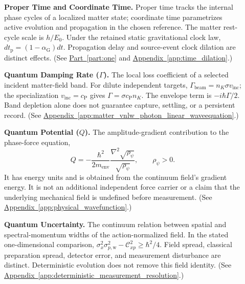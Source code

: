 \begin{description}
\item[] \begin{minipage}[t]{\linewidth}
\textbf{Proper Time and Coordinate Time.} Proper time tracks the internal phase cycles of a localized matter state; coordinate time parametrizes active evolution and propagation in the chosen reference. The matter rest-cycle scale is $h/E_0$. Under the retained static gravitational clock law, $dt_{\mathrm p}=(1-\alpha_{\mathrm G})dt$. Propagation delay and source-event clock dilation are distinct effects.
(See \hyperref[part:one]{Part~\ref*{part:one}} and \hyperref[app:time_dilation]{Appendix~\ref*{app:time_dilation}}.)
\end{minipage}

\item[] \begin{minipage}[t]{\linewidth}
\textbf{Quantum Damping Rate ($\Gamma$).} The local loss coefficient of a selected incident matter-field band. For dilute independent targets, $\Gamma_{\mathrm{beam}}=n_K\sigma v_{\mathrm{inc}}$; the specialization $v_{\mathrm{inc}}=c_{\mathrm P}$ gives $\Gamma=\sigma c_{\mathrm P}n_K$. The envelope term is $-i\hbar\Gamma/2$. Band depletion alone does not guarantee capture, settling, or a persistent record.
(See \hyperref[app:matter_vnlw_photon_linear_waveequation]{Appendix~\ref*{app:matter_vnlw_photon_linear_waveequation}}.)
\end{minipage}

\item[] \begin{minipage}[t]{\linewidth}
\textbf{Quantum Potential ($Q$).} The amplitude-gradient contribution to the phase-force equation,
\[
 Q=-\frac{\hbar^2}{2m_{\mathrm{env}}}
       \frac{\nabla^2\sqrt{\rho_\psi}}{\sqrt{\rho_\psi}},
 \qquad \rho_\psi>0.
\]
It has energy units and is obtained from the continuum field's gradient energy. It is not an additional independent force carrier or a claim that the underlying mechanical field is undefined before measurement.
(See \hyperref[app:physical_wavefunction]{Appendix~\ref*{app:physical_wavefunction}}.)
\end{minipage}

\item[] \begin{minipage}[t]{\linewidth}
\textbf{Quantum Uncertainty.} The continuum relation between spatial and spectral-momentum widths of the action-normalized field. In the stated one-dimensional comparison, $\sigma_x^2\sigma_{p,\mathrm w}^2-\mathcal C_{xp}^2\geq\hbar^2/4$. Field spread, classical preparation spread, detector error, and measurement disturbance are distinct. Deterministic evolution does not remove this field identity.
(See \hyperref[app:deterministic_measurement_resolution]{Appendix~\ref*{app:deterministic_measurement_resolution}}.)
\end{minipage}


\end{description}
